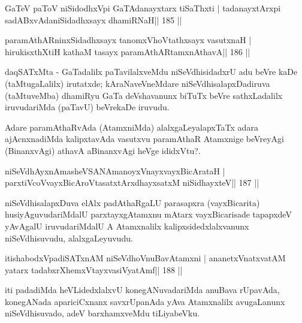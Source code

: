 
\begin{shl}
GaTeV paToV niSidodhxV\s pi GaTAdanayxtarx tiSaThxti |
tadanayxtArxpi sadABxvAdaniSidadhxsayx dhamiRNaH\hfill || 185 ||
\end{shl}

\begin{shl}
paramAthARninxSidadhxsayx tanomxVhoVtathxsayx vasutxnaH |
hirukisxthXtiH kathaM tasayx paramAthARtamxnA\s thavA\hfill || 186 ||
\end{shl}

\begin{artha}
daqSATxMta - GaTadalilx paTavilalxveMdu niSeVdhisidadxrU adu beVre kaDe (taMtugaLalilx) irutatxde; kAraNaveVneMdare niSeVdhisalapxDadiruva (taMtuveMba) dhamiRyu GaTa deVshavanunx biTuTx beVre sathxLadalilx iruvudariMda (paTavU) beVrekaDe iruvudu.
\end{artha}

\begin{artha}
Adare paramAthaRvAda (AtamxniMda) alalxgaLeyalapxTaTx adara ajAcnxnadiMda kalipxtavAda vasutxvu paramAthaR Atamxnige beVreyAgi (BinanxvAgi) athavA aBinanxvAgi heVge ididxVtu?.
\end{artha}


\begin{shl}
niSeVdhAyxnAmasheVSANAmanoyxVnayxvayxBicArataH |
parxtiVcoV\s vayxBicAroV\s tasatxtArxdhayxsatxM niSidhayxteV\hfill || 187 ||
\end{shl}

\begin{artha}
niSeVdhisalapxDuva elAlx padAthaRgaLU parasapxra (vayxBicarita) husiyAguvudariMdalU parxtayxgAtamxnu mAtarx vayxBicarisade tapapxdeV yAvAgalU iruvudariMdalU A Atamxnalilx kalipxsidedxlalxvanunx niSeVdhisuvudu, alalxgaLeyuvudu.
\end{artha}


\begin{shl}
itishabodxVpadiSATxnAM niSeVdhoV\s nuBavAtamxni |
ananetxV\s natxvatAM yatarx tadabxrXhemxVtayxvasiVyatAmf\hfill || 188 ||
\end{shl}

\begin{artha}
iti padadiMda heVLidedxlalxvU konegANuvadariMda anuBava rUpavAda, konegANada apariciCxnanx savxrUpanAda yAva Atamxnalilx avugaLanunx niSeVdhisuvado, adeV barxhamxveMdu tiLiyabeVku.
\end{artha}

